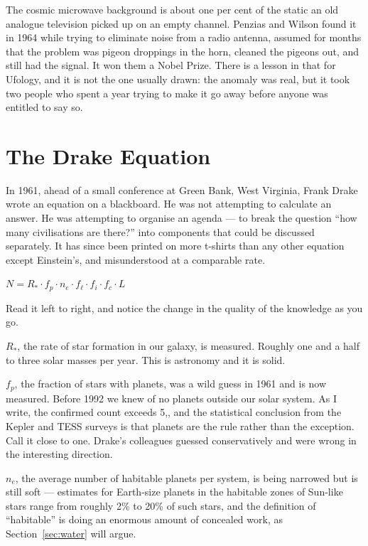 \begin{funfact}
The cosmic microwave background is about one per cent of the static an old analogue television
picked up on an empty channel. Penzias and Wilson found it in 1964 while trying to eliminate
noise from a radio antenna, assumed for months that the problem was pigeon droppings in the
horn, cleaned the pigeons out, and still had the signal. It won them a Nobel Prize. There is a
lesson in that for Ufology, and it is not the one usually drawn: the anomaly was real, but it
took two people who spent a year trying to make it go away before anyone was entitled to say
so.
\end{funfact}



\section{The Drake Equation}\label{sec:drake}

In 1961, ahead of a small conference at Green Bank, West Virginia, Frank Drake wrote an
equation on a blackboard. He was not attempting to calculate an answer. He was attempting to
organise an agenda --- to break the question ``how many civilisations are there?'' into
components that could be discussed separately. It has since been printed on more t-shirts
than any other equation except Einstein's, and misunderstood at a comparable rate.

\begin{center}
$N = R_* \cdot f_p \cdot n_e \cdot f_\ell \cdot f_i \cdot f_c \cdot L$
\end{center}

Read it left to right, and notice the change in the quality of the knowledge as you go.

$R_*$, the rate of star formation in our galaxy, is measured. Roughly one and a half to three
solar masses per year. This is astronomy and it is solid.

$f_p$, the fraction of stars with planets, was a wild guess in 1961 and is now measured.
Before 1992 we knew of no planets outside our solar system. As I write, the confirmed count
exceeds 5,, and the statistical conclusion from the Kepler and TESS surveys is that
planets are the rule rather than the exception. Call it close to one. Drake's colleagues
guessed conservatively and were wrong in the interesting direction.

$n_e$, the average number of habitable planets per system, is being narrowed but is still
soft --- estimates for Earth-size planets in the habitable zones of Sun-like stars range from
roughly 2\% to 20\% of such stars, and the definition of ``habitable'' is doing an enormous
amount of concealed work, as Section~\ref{sec:water} will argue.

